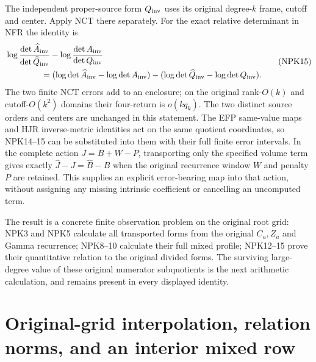 \documentclass[11pt,a4paper]{article}
\begin{document}
The independent proper-source form $Q_{\rm inv}$ uses its original
degree-$k$ frame, cutoff and center. Apply NCT there separately.
For the exact relative determinant in NFR the identity is
\[
 \begin{split}
 &\log\frac{\det\widehat A_{\rm inv}}{\det\widehat Q_{\rm inv}}
   -\log\frac{\det A_{\rm inv}}{\det Q_{\rm inv}}\\
 &\hspace{15mm}=
 (\log\det\widehat A_{\rm inv}-\log\det A_{\rm inv})
 -(\log\det\widehat Q_{\rm inv}-\log\det Q_{\rm inv}).
 \end{split}\tag{NPK15}
\]
The two finite NCT errors add to an enclosure; on the original
rank-$O(k)$ and cutoff-$O(k^2)$ domains their four-return is
$o(kq_k)$. The two distinct source orders and centers are
unchanged in this statement. The EFP same-value maps and HJR
inverse-metric identities act on the same quotient coordinates,
so NPK14--15 can be substituted into them with their full
finite error intervals. In the complete action $J=B+W-P$,
transporting only the specified volume term gives exactly
$\widehat J-J=\widehat B-B$ when the original recurrence window
$W$ and penalty $P$ are retained. This supplies an explicit
error-bearing map into that action, without assigning any
missing intrinsic coefficient or cancelling an uncomputed term.

The result is a concrete finite observation problem on the original
root grid: NPK3 and NPK5 calculate all transported forms from the
original $C_a,Z_a$ and Gamma recurrence; NPK8--10 calculate their
full mixed profile; NPK12--15 prove their quantitative relation to
the original divided forms. The surviving large-degree value of
these original numerator subquotients is the next arithmetic
calculation, and remains present in every displayed identity.
\endgroup

\label{MPBUILD:NUMERATOR_PROFILE_KERNEL:end}
\label{MTBUILD:NPK_COMPLETE_PREREQUISITE:end}

\clearpage
\label{MTBUILD:ORIGINAL_GRID_INTERIOR_INTERFACE_COMPLETE_PREREQUISITE:start}
\begingroup
\providecommand{\im}{\operatorname{im}}
\providecommand{\rank}{\operatorname{rank}}
\section{Original-grid interpolation, relation norms, and an interior mixed row}
\label{sec:IGI}
\end{document}
